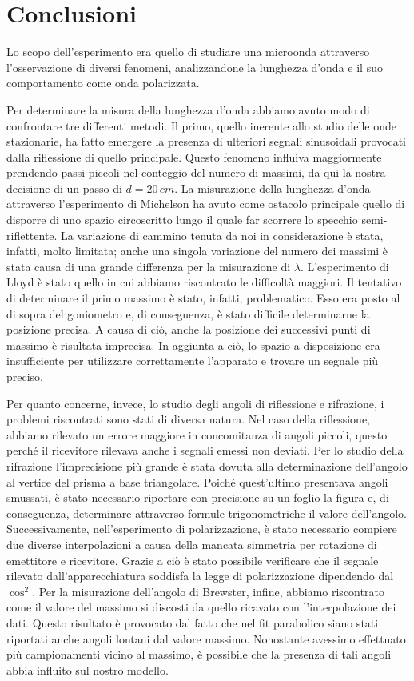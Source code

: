 \section{Conclusioni}
Lo scopo dell'esperimento era quello di studiare una microonda attraverso l'osservazione di diversi fenomeni, analizzandone la lunghezza d'onda e il suo comportamento come onda polarizzata.

Per determinare la misura della lunghezza d'onda abbiamo avuto modo di confrontare tre differenti metodi. Il primo, quello inerente allo studio delle onde stazionarie, ha fatto emergere la presenza di ulteriori segnali sinusoidali provocati dalla riflessione di quello principale. Questo fenomeno influiva maggiormente prendendo passi piccoli nel conteggio del numero di massimi, da qui la nostra decisione di un passo di $d = 20\,cm$. 
La misurazione della lunghezza d'onda attraverso l'esperimento di Michelson ha avuto come ostacolo principale quello di disporre di uno spazio circoscritto lungo il quale far scorrere lo specchio semi-riflettente. La variazione di cammino tenuta da noi in considerazione è stata, infatti, molto limitata; anche una singola variazione del numero dei massimi è stata causa di una grande differenza per la misurazione di $\lambda$.
L'esperimento di Lloyd è stato quello in cui abbiamo riscontrato le difficoltà maggiori. Il tentativo di determinare il primo massimo è stato, infatti, problematico. Esso era posto al di sopra del goniometro e, di conseguenza, è stato difficile determinarne la posizione precisa. A causa di ciò, anche la posizione dei successivi punti di massimo è risultata imprecisa. In aggiunta a ciò, lo spazio a disposizione era insufficiente per utilizzare correttamente l'apparato e trovare un segnale più preciso.

Per quanto concerne, invece, lo studio degli angoli di riflessione e rifrazione, i problemi riscontrati sono stati di diversa natura.
Nel caso della riflessione, abbiamo rilevato un errore maggiore in concomitanza di angoli piccoli, questo perché il ricevitore rilevava anche i segnali emessi non deviati. 
Per lo studio della rifrazione l'imprecisione più grande è stata dovuta alla determinazione dell'angolo al vertice del prisma a base triangolare. Poiché quest'ultimo presentava angoli smussati, è stato necessario riportare con precisione su un foglio la figura e, di conseguenza, determinare attraverso formule trigonometriche il valore dell'angolo.
Successivamente, nell'esperimento di polarizzazione, è stato necessario compiere due diverse interpolazioni a causa della mancata simmetria per rotazione di emettitore e ricevitore. Grazie a ciò è stato possibile verificare che il segnale rilevato dall'apparecchiatura soddisfa la legge di polarizzazione dipendendo dal $\cos^2$. 
Per la misurazione dell'angolo di Brewster, infine, abbiamo riscontrato come il valore del massimo si discosti da quello ricavato con l'interpolazione dei dati. Questo risultato è provocato dal fatto che nel fit parabolico siano stati riportati anche angoli lontani dal valore massimo. Nonostante avessimo effettuato più campionamenti vicino al massimo, è possibile che la presenza di tali angoli abbia influito sul nostro modello.



